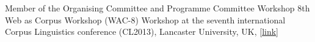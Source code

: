         {Member of the Organising Committee and Programme Committee}
        {Workshop}
        {8th Web as Corpus Workshop (WAC-8)}
        {Workshop at the seventh international Corpus Linguistics
        conference (CL2013), Lancaster University, UK,
        [\href{https://sigwac.org.uk/wiki/WAC8}{link}]}
        {}




